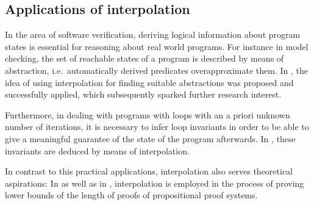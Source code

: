 \documentclass[,%
			paper=a4,%
			DIV10,
			liststotoc,
			bibtotoc,
			draft=false,%
			numbers=noendperiod
			]{scrartcl}
\begin{document}
\subsection{Applications of interpolation}
\label{application}

In the area of software verification, deriving logical information about program states is essential for reasoning about real world programs.
For instance in model checking, the set of reachable states of a program is described by means of abstraction, i.e.\ automatically derived predicates overapproximate them.
In \cite{McMillan03}, the idea of using interpolation for finding suitable abstractions was proposed and successfully applied, which subsequently sparked further research interest. 

Furthermore, in dealing with programs with loops with an a priori unknown number of iterations, it is necessary to infer loop invariants in order to be able to give a meaningful guarantee of the state of the program afterwards.
In \cite{weissenbacher2010}, these invariants are deduced by means of interpolation.

In contrast to this practical applications, interpolation also serves theoretical aspirations: In \cite{Pudlak97} as well as in \cite{krajivcek1997interpolation}, interpolation is employed in the process of proving lower bounds of the length of proofs of propositional proof systems.


\begin{comment}
After decades of continued research, the area of software verification still lacks effective methods for reasoning about real world programs, which is necessary to prove vital safety or liveness properties.
The emergence of symbolic model checking and bounded model checking constitute considerable advances.
Here, the set of reachable states of a program are described by means of abstraction, i.e.\ automatically derived predicates overapproximate them.
However for actually finding suitable abstractions, sophisticated methods are required.


In recent years, the approach of applying Craig interpolation to solve both of these problems enjoyed increasing popularity, especially after successful applications for instance in \cite{McMillan03} for use in abstraction or \cite{weissenbacher2010} for use in loop invariant generation.


Another noteworthy and in fact one of the first interpolation algorithms of practical interest was introduced in \cite{McMillan03}, where it was also embedded in a model checking procedure.
\end{comment}
\end{document}
